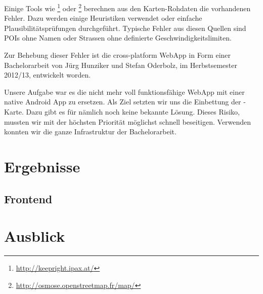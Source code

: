 Einige Tools wie \footnote{\url{http://keepright.ipax.at/}} oder \footnote{\url{http://osmose.openstreetmap.fr/map/}} berechnen aus den Karten-Rohdaten die vorhandenen Fehler.
Dazu werden einige Heuristiken verwendet oder einfache Plausibilitätsprüfungen durchgeführt.
Typische Fehler aus diesen Quellen sind \glspl{POI} ohne Namen oder Strassen ohne definierte Geschwindigkeitslimiten.

Zur Behebung dieser Fehler ist die cross-platform \gls{WebApp} \kort{} in Form einer Bachelorarbeit von Jürg Hunziker und Stefan Oderbolz, im Herbstsemester 2012/13, entwickelt  worden.

Unsere Aufgabe war es die nicht mehr voll funktionsfähige \gls{WebApp} mit einer native Android App zu ersetzen.
Als Ziel setzten wir uns die Einbettung der -Karte.
Dazu gibt es für  nämlich noch keine bekannte Lösung. 
Dieses Risiko, mussten wir mit der höchsten Priorität möglichst schnell beseitigen.
Verwenden konnten wir die ganze Infrastruktur der \kort{} Bachelorarbeit.


\section*{Ergebnisse}

\subsection*{Frontend}

\section*{Ausblick}
